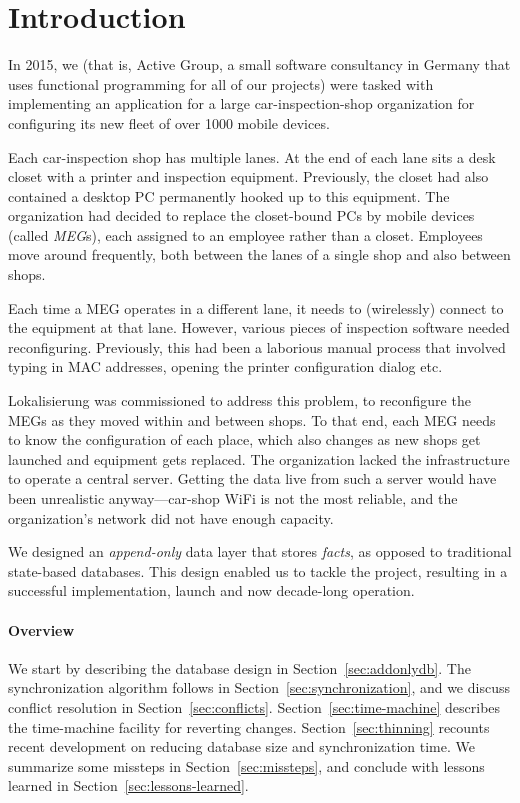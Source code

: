 \documentclass[sigplan,review]{acmart}
\begin{document}
\maketitle

\section{Introduction}

In 2015, we (that is, Active Group, a small software consultancy in
Germany that uses functional programming for all of our projects) were
tasked with implementing an application for a large
car-inspection-shop organization for configuring its new fleet of
over 1000 mobile devices.

Each car-inspection shop has multiple lanes.
At the end of each lane sits a desk closet with a printer
and inspection equipment.  Previously, the closet
had also contained a desktop PC permanently hooked up to this
equipment.  The organization had decided to replace the closet-bound
PCs by mobile devices (called \textit{MEG}s), each assigned to an
employee rather than a closet. Employees move around frequently, both
between the lanes of a single shop and also between shops.

Each time a MEG operates in a different lane, it needs to (wirelessly)
connect to
the equipment at that lane. However, various pieces of inspection software needed
reconfiguring. Previously, this had been a laborious manual process
that involved typing in MAC addresses, opening the printer
configuration dialog etc.

Lokalisierung was commissioned to address this problem, to reconfigure
the MEGs as they moved within and between shops.  To that end, each
MEG needs to know the configuration of each place, which also changes
as new shops get launched and equipment gets replaced.  The
organization lacked the infrastructure to operate a central server.
Getting the data live from such a server would have been unrealistic
anyway---car-shop WiFi is not the most reliable, and the
organization's network did not have enough capacity.

We designed an \textit{append-only} data layer that stores
\textit{facts}, as opposed to traditional state-based databases. This
design enabled us to tackle the project, resulting in a successful
implementation, launch and now decade-long operation.

\paragraph{Overview} We start by describing the database design in
Section~\ref{sec:addonlydb}.  The synchronization algorithm follows in
Section~\ref{sec:synchronization}, and we discuss conflict resolution
in Section~\ref{sec:conflicts}.  Section~\ref{sec:time-machine} describes
the time-machine facility for reverting changes.
Section~\ref{sec:thinning} recounts recent development on reducing
database size and synchronization time.  We summarize some missteps in
Section~\ref{sec:missteps}, and conclude with lessons learned in
Section~\ref{sec:lessons-learned}.
\end{document}
